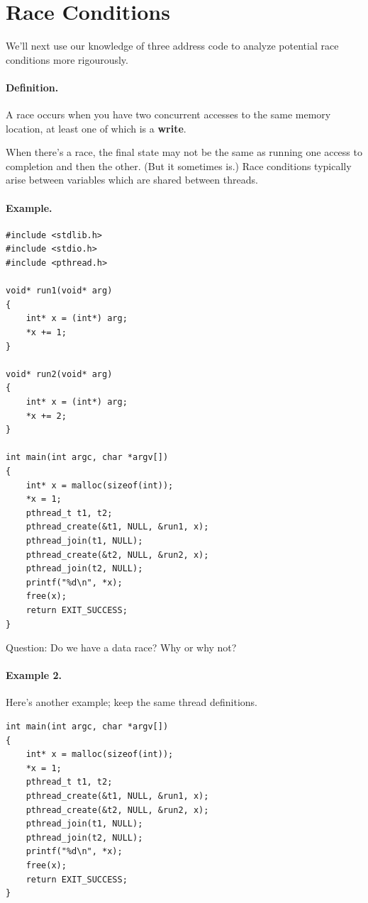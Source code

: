 \documentclass[11pt]{article}
\begin{document}
\section*{Race Conditions}
We'll next use our knowledge of three address code to analyze
potential race conditions more rigourously.

\paragraph{Definition.} A race occurs when you have two concurrent accesses to the
same memory location, at least one of which is a {\bf write}.

When there's a race, the final state may not be the same as running
one access to completion and then the other. (But it sometimes is.)
Race conditions typically arise between variables which are shared
between threads.

\paragraph{Example.}
\begin{lstlisting}
#include <stdlib.h>
#include <stdio.h>
#include <pthread.h>

void* run1(void* arg)
{
    int* x = (int*) arg;
    *x += 1;
}

void* run2(void* arg)
{
    int* x = (int*) arg;
    *x += 2;
}

int main(int argc, char *argv[])
{
    int* x = malloc(sizeof(int));
    *x = 1;
    pthread_t t1, t2;
    pthread_create(&t1, NULL, &run1, x);
    pthread_join(t1, NULL);
    pthread_create(&t2, NULL, &run2, x);
    pthread_join(t2, NULL);
    printf("%d\n", *x);
    free(x);
    return EXIT_SUCCESS;
}
\end{lstlisting}

\noindent
Question: Do we have a data race? Why or why not?
\vspace*{2em}

\paragraph{Example 2.} Here's another example; keep the same thread definitions.
\begin{lstlisting}
int main(int argc, char *argv[])
{
    int* x = malloc(sizeof(int));
    *x = 1;
    pthread_t t1, t2;
    pthread_create(&t1, NULL, &run1, x);
    pthread_create(&t2, NULL, &run2, x);
    pthread_join(t1, NULL);
    pthread_join(t2, NULL);
    printf("%d\n", *x);
    free(x);
    return EXIT_SUCCESS;
}
\end{lstlisting}
\end{document}
